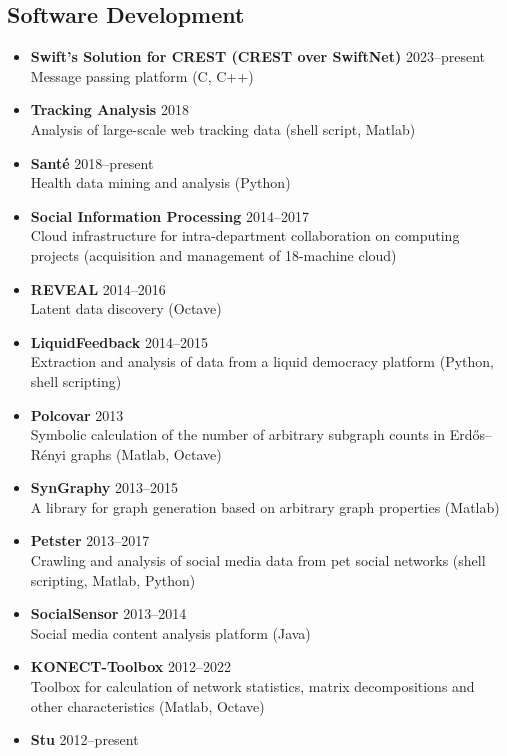\documentclass[line,mm]{res}
\newcounter{x}
\newcounter{y}
\newcounter{z}
\begin{document}
\begin{resume}
\section{Software Development}
\begin{itemize}
\item \textbf{Swift's Solution for CREST (CREST over SwiftNet)} \hfill 2023--present \\
  Message passing platform (C, C++)
\item \textbf{Tracking Analysis} \hfill 2018 \\
  Analysis of large-scale web tracking data (shell script, Matlab)
\item \textbf{Santé} \hfill 2018--present \\
  Health data mining and analysis (Python)
\item \textbf{Social Information Processing} \hfill 2014--2017 \\
  Cloud infrastructure for intra-department collaboration on computing projects
  (acquisition and management of 18-machine cloud)
\item \textbf{REVEAL} \hfill 2014--2016 \\
  Latent data discovery (Octave)
\item \textbf{LiquidFeedback} \hfill 2014--2015 \\
  Extraction and analysis of data from a liquid democracy platform (Python,
  shell scripting)
\item \textbf{Polcovar} \hfill 2013 \\
  Symbolic calculation of the number of arbitrary subgraph counts in Erdős--Rényi
  graphs (Matlab, Octave)
\item \textbf{SynGraphy} \hfill 2013--2015 \\
  A library for graph generation based on arbitrary graph properties (Matlab) 
\item \textbf{Petster} \hfill 2013--2017 \\
  Crawling and analysis of social media data from pet social networks (shell
  scripting, Matlab, Python)
\item \textbf{SocialSensor} \hfill 2013--2014 \\
  Social media content analysis platform (Java)
\item \textbf{KONECT-Toolbox} \hfill 2012--2022 \\
  Toolbox for calculation of network statistics, matrix decompositions and other
  characteristics (Matlab, Octave)
\item \textbf{Stu} \hfill 2012--present \\

\end{itemize}
\end{resume}
\end{document}
